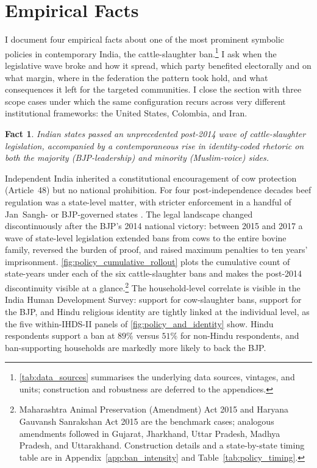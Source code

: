 \documentclass[11pt,twoside]{extarticle}
\newtheorem{fact}{Fact}
\begin{document}

\section{Empirical Facts} \label{sec:empirical_facts}

I document four empirical facts about one of the most prominent symbolic policies in contemporary India, the cattle-slaughter ban.\footnote{\autoref{tab:data_sources} summarises the underlying data sources, vintages, and units; construction and robustness are deferred to the appendices.} I ask when the legislative wave broke and how it spread, which party benefited electorally and on what margin, where in the federation the pattern took hold, and what consequences it left for the targeted communities. I close the section with three scope cases under which the same configuration recurs across very different institutional frameworks: the United States, Colombia, and Iran.

\begin{fact}\label{fact:1}
Indian states passed an unprecedented post-2014 wave of cattle-slaughter legislation, accompanied by a contemporaneous rise in identity-coded rhetoric on both the majority (BJP-leadership) and minority (Muslim-voice) sides.
\end{fact}

Independent India inherited a constitutional encouragement of cow protection (Article~48) but no national prohibition. For four post-independence decades beef regulation was a state-level matter, with stricter enforcement in a handful of Jan~Sangh- or BJP-governed states \citep*{jaffrelotHinduNationalistMovement1999}. The legal landscape changed discontinuously after the BJP's 2014 national victory: between 2015 and 2017 a wave of state-level legislation extended bans from cows to the entire bovine family, reversed the burden of proof, and raised maximum penalties to ten years' imprisonment. \autoref{fig:policy_cumulative_rollout} plots the cumulative count of state-years under each of the six cattle-slaughter bans and makes the post-2014 discontinuity visible at a glance.\footnote{Maharashtra Animal Preservation (Amendment) Act 2015 and Haryana Gauvansh Sanrakshan Act 2015 are the benchmark cases; analogous amendments followed in Gujarat, Jharkhand, Uttar Pradesh, Madhya Pradesh, and Uttarakhand. Construction details and a state-by-state timing table are in Appendix~\ref{app:ban_intensity} and Table~\ref{tab:policy_timing}.} The household-level correlate is visible in the India Human Development Survey: support for cow-slaughter bans, support for the BJP, and Hindu religious identity are tightly linked at the individual level, as the five within-IHDS-II panels of \autoref{fig:policy_and_identity} show. Hindu respondents support a ban at $89\%$ versus $51\%$ for non-Hindu respondents, and ban-supporting households are markedly more likely to back the BJP.
\end{document}
